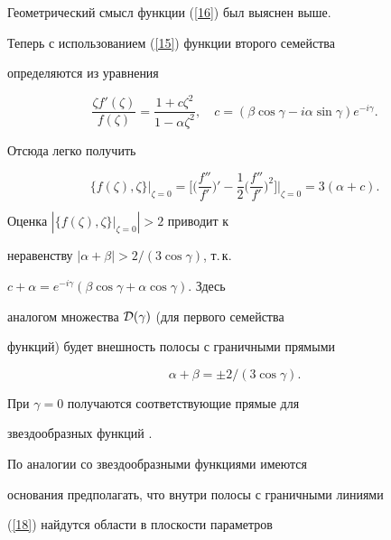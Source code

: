 Геометрический смысл функции (\ref{16}) был выяснен выше.





Теперь с использованием (\ref{15}) функции второго семейства


определяются из уравнения


\begin{equation}\label{17}


\frac{\zeta


f'(\zeta)}{f(\zeta)}=\frac{1+c\zeta^2}{1-\alpha\zeta^2}, \quad


c=(\beta\cos\gamma-i\alpha\sin\gamma)e^{-i\gamma}.


\end{equation}


Отсюда легко получить


$$


\{f(\zeta),\zeta \}\big|_{\zeta=0}=


\bigg[\bigg(\frac{f''}{f'}


\bigg)'-\frac12\bigg(\frac{f''}{f'}


\bigg)^2\bigg]\bigg|_{\zeta=0}=3(\alpha+c).


$$


Оценка $|\{f(\zeta),\zeta\}\big|_{\zeta=0}|>2$ приводит к


неравенству $|\alpha+\beta|>{2}/(3\cos\gamma)$, т.\,к.


$c+\alpha=e^{-i\gamma}(\beta\cos\gamma+\alpha\cos\gamma)$. Здесь


аналогом множества ${\cal D}(\gamma)$ (для первого семейства


функций) будет внешность полосы с граничными прямыми


\begin{equation}\label{18}


\alpha+\beta=\pm{2}/(3\cos\gamma).


\end{equation}


При $\gamma=0$ получаются соответствующие прямые для


звездообразных функций \cite{4}.





По аналогии со звездообразными функциями \cite{4} имеются


основания предполагать, что внутри полосы с граничными линиями


(\ref{18}) найдутся области в плоскости параметров


